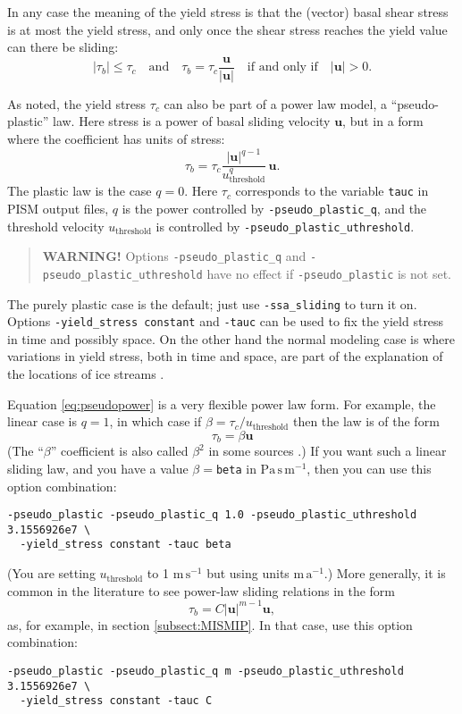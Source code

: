 In any case the meaning of the yield stress is that the (vector) basal shear stress is at most the yield stress, and only once the shear stress reaches the yield value can there be sliding:
\begin{equation*}
   |\tau_b| \le \tau_c \quad \text{and} \quad \tau_b = \tau_c \frac{\mathbf{u}}{|\mathbf{u}|} \quad\text{if and only if}\quad |\mathbf{u}| > 0.
\end{equation*}

As noted, the yield stress $\tau_c$ can also be part of a power law model, a ``pseudo-plastic'' law.  Here stress is a power of basal sliding velocity $\mathbf{u}$, but in a form where the coefficient has units of stress:
\begin{equation}
\tau_b = \tau_c \frac{|\mathbf{u}|^{q-1}}{u_{\text{threshold}}^q}\, \mathbf{u}.
\label{eq:pseudopower}
\end{equation}
The plastic law is the case $q=0$.  Here $\tau_c$ corresponds to the variable \texttt{tauc} in PISM output files, $q$ is the power controlled by \texttt{-pseudo_plastic_q}, and the threshold velocity $u_{\text{threshold}}$ is controlled by \texttt{-pseudo_plastic_uthreshold}.

\begin{quote}
  \textbf{WARNING!} Options \texttt{-pseudo_plastic_q} and \texttt{-pseudo_plastic_uthreshold} have no effect if \texttt{-pseudo_plastic} is not set.
\end{quote}

The purely plastic case is the default; just use \texttt{-ssa_sliding} to turn it on.  Options \texttt{-yield_stress constant} and \texttt{-tauc} can be used to fix the yield stress in time and possibly space.  On the other hand the normal modeling case is where variations in yield stress, both in time and space, are part of the explanation of the locations of ice streams \cite{SchoofStream}.

Equation \eqref{eq:pseudopower} is a very flexible power law form.  For example, the linear case is $q=1$, in which case if $\beta=\tau_c/u_{\text{threshold}}$ then the law is of the form
    $$\tau_b = \beta \mathbf{u}$$
(The ``$\beta$'' coefficient is also called $\beta^2$ in some sources \cite[for example]{MacAyeal}.)  If you want such a linear sliding law, and you have a value $\beta=$\texttt{beta} in $\text{Pa}\,\text{s}\,\text{m}^{-1}$, then you can use this option combination:
\begin{verbatim}
-pseudo_plastic -pseudo_plastic_q 1.0 -pseudo_plastic_uthreshold 3.1556926e7 \
  -yield_stress constant -tauc beta
\end{verbatim}
\noindent (You are setting $u_{\text{threshold}}$ to 1 $\text{m}\,\text{s}^{-1}$ but using units $\text{m}\,\text{a}^{-1}$.)  More generally, it is common in the literature to see power-law sliding relations in the form
    $$\tau_b = C |\mathbf{u}|^{m-1} \mathbf{u},$$
as, for example, in section \ref{subsect:MISMIP}.  In that case, use this option combination:
\begin{verbatim}
-pseudo_plastic -pseudo_plastic_q m -pseudo_plastic_uthreshold 3.1556926e7 \
  -yield_stress constant -tauc C
\end{verbatim}

